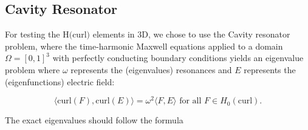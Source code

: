 \documentclass[manuscript,screen]{acmart}
\newcommand{\R}{\mathbb{R}}
\newcommand{\akg}[1]{\textcolor{blue}{\textbf{AG:} #1}}
\begin{document}


  
\newpage
  \subsection{Cavity Resonator}

\noindent For testing the H$($curl$)$ elements in 3D, we chose to use the Cavity resonator problem, where the time-harmonic Maxwell equations applied to a domain $\Omega = [0,1]^3$ with perfectly conducting boundary conditions yields an eigenvalue problem where $\omega$ represents the (eigenvalues) resonances and $E$ represents the (eigenfunctions) electric field:

\begin{equation}
    \langle \text{curl}(F), \text{curl}(E) \rangle = \omega^2 \langle F, E \rangle \text{ for all } F \in H_0(\text{curl}).
\end{equation}


\noindent The exact eigenvalues should follow the formula
\end{document}
